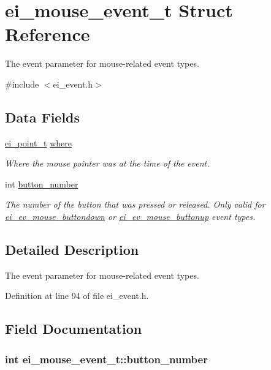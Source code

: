 \hypertarget{structei__mouse__event__t}{\section{ei\+\_\+mouse\+\_\+event\+\_\+t Struct Reference}
\label{structei__mouse__event__t}
}


The event parameter for mouse-\/related event types.  




{\ttfamily \#include $<$ei\+\_\+event.\+h$>$}

\subsection*{Data Fields}
\begin{DoxyCompactItemize}
\item 
\hyperlink{structei__point__t}{ei\+\_\+point\+\_\+t} \hyperlink{structei__mouse__event__t_ac50f216f7af2a99469bd39cebc309af5}{where}
\begin{DoxyCompactList}\small\item\em Where the mouse pointer was at the time of the event. \end{DoxyCompactList}\item 
int \hyperlink{structei__mouse__event__t_a3165d2e07c861aa9ccb114a10a6b0afb}{button\+\_\+number}
\begin{DoxyCompactList}\small\item\em The number of the button that was pressed or released. Only valid for \hyperlink{ei__event_8h_a132dde064150d861ad24e9d839cbe007ae75b2b6a8423d54c46a418d222e0af66}{ei\+\_\+ev\+\_\+mouse\+\_\+buttondown} or \hyperlink{ei__event_8h_a132dde064150d861ad24e9d839cbe007aabd9931e36fb3628cc044a2aafc2c7e4}{ei\+\_\+ev\+\_\+mouse\+\_\+buttonup} event types. \end{DoxyCompactList}\end{DoxyCompactItemize}


\subsection{Detailed Description}
The event parameter for mouse-\/related event types. 

Definition at line 94 of file ei\+\_\+event.\+h.



\subsection{Field Documentation}
\hypertarget{structei__mouse__event__t_a3165d2e07c861aa9ccb114a10a6b0afb}{
\subsubsection[{button\+\_\+number}]{\setlength{\rightskip}{0pt plus 5cm}int ei\+\_\+mouse\+\_\+event\+\_\+t\+::button\+\_\+number}}\label{structei__mouse__event__t_a3165d2e07c861aa9ccb114a10a6b0afb}


